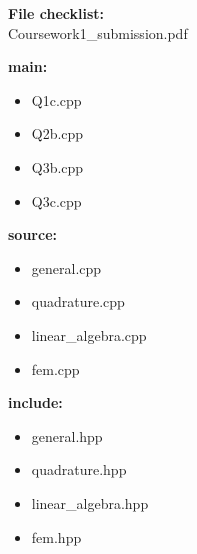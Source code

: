\documentclass[a4,10pt, fleqn]{article}  %
\begin{document}
\vspace*{0.3cm}
{\bf File checklist:} \\
Coursework1\_submission.pdf
 \begin{multicols}{3}
\textbf{main:}
\begin{itemize}
\item Q1c.cpp
\item Q2b.cpp
\item Q3b.cpp
\item Q3c.cpp
\end{itemize}
\vfill\null
\columnbreak
\textbf{source:}
\begin{itemize}
\item general.cpp
\item quadrature.cpp
\item linear\_algebra.cpp
\item fem.cpp
\end{itemize}
\vfill\null
\columnbreak
\textbf{include:}
\begin{itemize}
\item general.hpp
\item quadrature.hpp
\item linear\_algebra.hpp
\item fem.hpp
\end{itemize}
\vfill\null
\columnbreak
\end{multicols}
\end{document}
